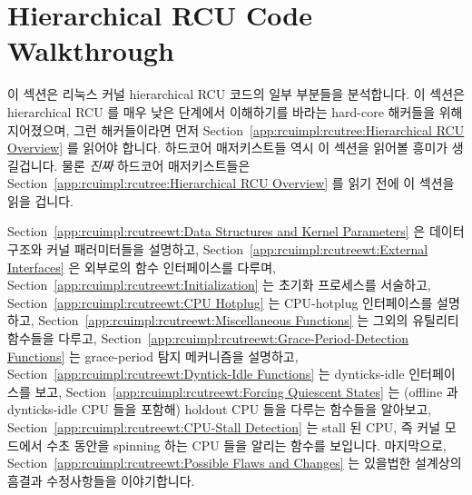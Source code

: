 
\section{Hierarchical RCU Code Walkthrough}
\label{app:rcuimpl:rcutreewt:Hierarchical RCU Code Walkthrough}

이 섹션은 리눅스 커널 hierarchical RCU 코드의 일부 부분들을 분석합니다.
이 섹션은 hierarchical RCU 를 매우 낮은 단계에서 이해하기를 바라는 hard-core
해커들을 위해 지어졌으며, 그런 해커들이라면 먼저
Section~\ref{app:rcuimpl:rcutree:Hierarchical RCU Overview} 를 읽어야 합니다.
하드코어 매저키스트들 역시 이 섹션을 읽어볼 흥미가 생길겁니다.
물론 \emph{진짜} 하드코어 매저키스트들은
Section~\ref{app:rcuimpl:rcutree:Hierarchical RCU Overview} 를 읽기 전에 이
섹션을 읽을 겁니다.
\iffalse

This section walks through selected sections of the Linux-kernel
hierarchical RCU code.
As such, this section is intended for hard-core hackers who wish
to understand hierarchical RCU at a very low level, and such hackers
should first read
Section~\ref{app:rcuimpl:rcutree:Hierarchical RCU Overview}.
Hard-core masochists might also be interested in reading this section.
Of course \emph{really} hard-core masochists will read this section
before reading
Section~\ref{app:rcuimpl:rcutree:Hierarchical RCU Overview}.
\fi

Section~\ref{app:rcuimpl:rcutreewt:Data Structures and Kernel Parameters}
은 데이터 구조와 커널 패러미터들을 설명하고,
Section~\ref{app:rcuimpl:rcutreewt:External Interfaces}
은 외부로의 함수 인터페이스를 다루며,
Section~\ref{app:rcuimpl:rcutreewt:Initialization}
는 초기화 프로세스를 서술하고,
Section~\ref{app:rcuimpl:rcutreewt:CPU Hotplug}
는 CPU-hotplug 인터페이스를 설명하고,
Section~\ref{app:rcuimpl:rcutreewt:Miscellaneous Functions}
는 그외의 유틸리티 함수들을 다루고,
Section~\ref{app:rcuimpl:rcutreewt:Grace-Period-Detection Functions}
는 grace-period 탐지 메커니즘을 설명하고,
Section~\ref{app:rcuimpl:rcutreewt:Dyntick-Idle Functions}
는 dynticks-idle 인터페이스를 보고,
Section~\ref{app:rcuimpl:rcutreewt:Forcing Quiescent States}
는 (offline 과 dynticks-idle CPU 들을 포함해) holdout CPU 들을 다루는 함수들을
알아보고,
Section~\ref{app:rcuimpl:rcutreewt:CPU-Stall Detection}
는 stall 된 CPU, 즉 커널 모드에서 수초 동안을 spinning 하는 CPU 들을 알리는
함수를 보입니다.
마지막으로,
Section~\ref{app:rcuimpl:rcutreewt:Possible Flaws and Changes}
는 있을법한 설계상의 흠결과 수정사항들을 이야기합니다.
\iffalse

